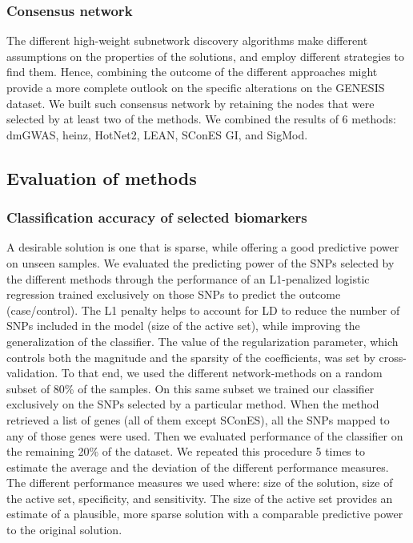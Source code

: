 \documentclass[twocolumn, 10pt]{article}
\begin{document}
\subsubsection{Consensus network}
\label{methods:consensus}
The different high-weight subnetwork discovery algorithms make different assumptions on the properties of the solutions, and employ different strategies to find them. Hence, combining the outcome of the different approaches might provide a more complete outlook on the specific alterations on the GENESIS dataset. We built such consensus network by retaining the nodes that were selected by at least two of the methods. We combined the results of 6 methods: dmGWAS, heinz, HotNet2, LEAN, SConES GI, and SigMod. 

\subsection{Evaluation of methods}
\label{sec:orgc968928}
\subsubsection{Classification accuracy of selected biomarkers}
\label{methods:comparison}
A desirable solution is one that is sparse, while offering a good predictive power on unseen samples. We evaluated the predicting power of the SNPs selected by the different methods through the performance of an L1-penalized logistic regression trained exclusively on those SNPs to predict the outcome (case/control). The L1 penalty helps to account for LD to reduce the number of SNPs included in the model (size of the active set), while improving the generalization of the classifier. The value of the regularization parameter, which controls both the magnitude and the sparsity of the coefficients, was set by cross-validation. To that end, we used the different network-methods on a random subset of 80\% of the samples. On this same subset we trained our classifier exclusively on the SNPs selected by a particular method. When the method retrieved a list of genes (all of them except SConES), all the SNPs mapped to any of those genes were used. Then we evaluated performance of the classifier on the remaining 20\% of the dataset. We repeated this procedure 5 times to estimate the average and the deviation of the different performance measures. The different performance measures we used where: size of the solution, size of the active set, specificity, and sensitivity. The size of the active set provides an estimate of a plausible, more sparse solution with a comparable predictive power to the original solution. 
\end{document}
